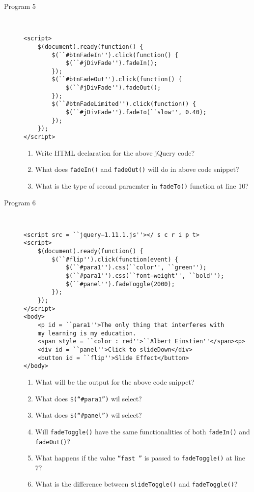 \documentclass[11pt,a4paper]{article}
\def\AnswerBox{\fbox{\begin{minipage}{4in}\hfill\vspace{0.5in}\end{minipage}}}
\begin{document}
\begin{description}
\item [Program 5]\ 
\begin{lstlisting}
<script>
    $(document).ready(function() {
        $(``#btnFadeIn'').click(function() {
            $(``#jDivFade'').fadeIn();
        });
        $(``#btnFadeOut'').click(function() {
            $(``#jDivFade'').fadeOut();
        });
        $(``#btnFadeLimited'').click(function() {
            $(``#jDivFade'').fadeTo(``slow'', 0.40);
        });        
    });
</script>
\end{lstlisting}
\AnswerBox

\begin{enumerate}[label=\bfseries Q\arabic*:]\itemsep10pt
\item Write HTML declaration for the above jQuery code?
\item What does \texttt{fadeIn()} and \texttt{fadeOut()} will do in above code snippet?
\item What is the type of second paraemter in \texttt{fadeTo()} function at line 10?
\end{enumerate}

\item [Program 6]\ 
\begin{lstlisting}
<script src = ``jquery−1.11.1.js''></ s c r i p t>
<script>
    $(document).ready(function() {
        $(``#flip'').click(function(event) {
            $(``#para1'').css(``color'', ``green'');
            $(``#para1'').css(``font−weight'', ``bold'');
            $(``#panel'').fadeToggle(2000);
        });
    });
</script>
<body>
    <p id = ``para1''>The only thing that interferes with 
    my learning is my education.
    <span style = ``color : red''>``Albert Einstien''</span><p>
    <div id = ``panel''>Click to slideDown</div>
    <button id = ``flip''>Slide Effect</button>
</body>
\end{lstlisting}
\AnswerBox

\begin{enumerate}[label=\bfseries Q\arabic*:]\itemsep10pt
\item What will be the output for the above code snippet?
\item What does \texttt{\$(``\#para1'')} wil select?
\item What does \texttt{\$(``\#panel'')} wil select?
\item Will \texttt{fadeToggle()} have the same functionalities of both \texttt{fadeIn()} and \texttt{fadeOut()}?
\item What happens if the value \texttt{``fast ''} is passed to \texttt{fadeToggle()} at line 7?
\item What is the difference between \texttt{slideToggle()} and \texttt{fadeToggle()}?
\end{enumerate}

\end{description}
\end{document}
